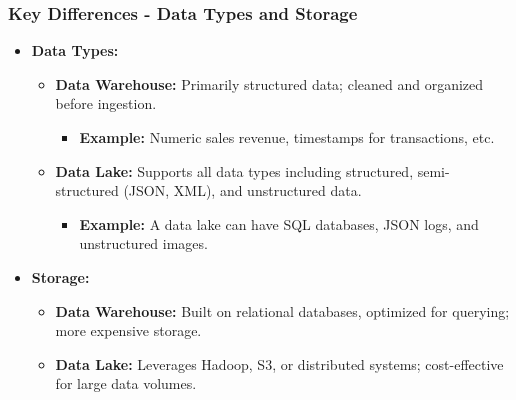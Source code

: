 \documentclass[aspectratio=169]{beamer}
\begin{document}
\begin{frame}[fragile]
    \frametitle{Key Differences - Data Types and Storage}
    \begin{itemize}
        \item \textbf{Data Types:}
        \begin{itemize}
            \item \textbf{Data Warehouse:} Primarily structured data; cleaned and organized before ingestion.
            \begin{itemize}
                \item \textbf{Example:} Numeric sales revenue, timestamps for transactions, etc.
            \end{itemize}

            \item \textbf{Data Lake:} Supports all data types including structured, semi-structured (JSON, XML), and unstructured data.
            \begin{itemize}
                \item \textbf{Example:} A data lake can have SQL databases, JSON logs, and unstructured images.
            \end{itemize}
        \end{itemize}

        \item \textbf{Storage:}
        \begin{itemize}
            \item \textbf{Data Warehouse:} Built on relational databases, optimized for querying; more expensive storage.
            \item \textbf{Data Lake:} Leverages Hadoop, S3, or distributed systems; cost-effective for large data volumes.
        \end{itemize}
    \end{itemize}
\end{frame}
\end{document}
